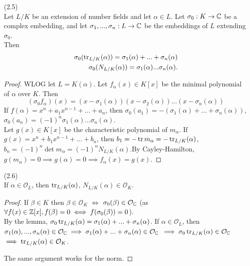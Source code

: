\documentclass[a4paper]{article}
\begin{document}
\begin{lemma} (2.5)\\
Let $L/K$ be an extension of number fields and let $\alpha \in L$. Let $\sigma_0:K \to \mathbb{C}$ be a complex embedding, and let $\sigma_1,...,\sigma_n:L \to \mathbb{C}$ be the embeddings of $L$ extending $\sigma_0$.\\
Then 
\begin{equation*}
\begin{aligned}
\sigma_0(\operatorname{tr}_{L/K} (\alpha)) = \sigma_1(\alpha) + ... + \sigma_n(\alpha)\\
\sigma_0(N_{L/K}(\alpha)) = \sigma_1(\alpha)...\sigma_n(\alpha).
\end{aligned}
\end{equation*}
\begin{proof}
WLOG let $L=K(\alpha)$. Let $f_\alpha(x) \in K[x]$ be the minimal polynomial of $\alpha$ over $K$. Then $$(\sigma_0 f_\alpha)(x) = (x-\sigma_1(\alpha))(x-\sigma_2(\alpha))...(x-\sigma_n(\alpha))$$
If $f(\alpha) = x^n+a_1x^{n-1}+...+a_n$, then $\sigma_0(a_1) = -(\sigma_1(\alpha)+...+\sigma_n(\alpha))$, $\sigma_0(a_n) = (-1)^n \sigma_1(\alpha)...\sigma_n(\alpha)$.\\
Let $g(x) \in K[x]$ be the characteristic polynomial of $m_\alpha$. If $g(x) = x^n+b_1x^{n-1}+...+b_n$, then $b_1 = -\operatorname{tr} m_\alpha = -\operatorname{tr}_{L/K}(\alpha)$, $b_n = (-1)^n \det m_\alpha = (-1)^n N_{L/K}(\alpha)$.By Cayley-Hamilton, $g(m_\alpha) = 0 \implies g(\alpha) = 0 \implies f_\alpha(x) = g(x)$.
\end{proof}
\end{lemma}

\begin{coro} (2.6)\\
If $\alpha \in \mathcal{O}_L$, then $\operatorname{tr}_{L/K}(\alpha)$, $N_{L/K}(\alpha) \in \mathcal{O}_K$.
\begin{proof}
If $\beta \in K$ then $\beta \in \mathcal{O}_K$ $\iff$ $\sigma_0(\beta) \in \mathcal{O}_{\mathbb{C}}$ (as $\forall f(x) \in \mathbb{Z}[x], f(\beta) = 0 \iff f(\sigma_0(\beta)) = 0$).\\
By the lemma, $\sigma_0 \operatorname{tr}_{L/K} (\alpha) = \sigma_1(\alpha)+...+\sigma_n(\alpha)$. If $\alpha \in \mathcal{O}_L$, then $\sigma_1(\alpha),...,\sigma_n(\alpha) \in \mathcal{O}_{\mathbb{C}} \implies \sigma_1(\alpha)+...+\sigma_n(\alpha) \in \mathcal{O}_{\mathbb{C}}$ $\implies \sigma_0 \operatorname{tr}_{L/K}(\alpha) \in \mathcal{O}_{\mathbb{C}}$ $\implies \operatorname{tr}_{L/K}(\alpha) \in \mathcal{O}_K$.

The same argument works for the norm.
\end{proof}
\end{coro}
\end{document}
